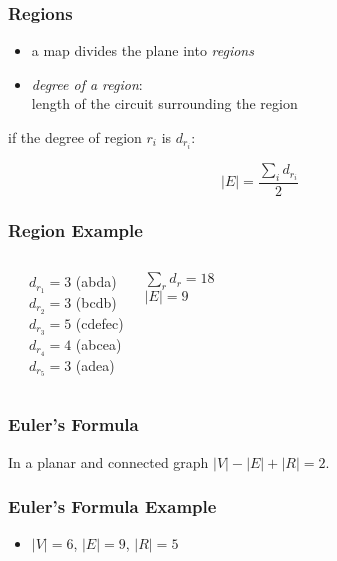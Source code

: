 \documentclass[dvipsnames]{beamer}
\begin{document}
\begin{frame}
  \frametitle{Regions}

  \begin{itemize}
    \item a map divides the plane into \emph{regions}
    \item \emph{degree of a region}:\\
      length of the circuit surrounding the region
  \end{itemize}

  \pause
  \begin{theorem}
    if the degree of region $r_i$ is $d_{r_i}$:

    \[ |E| = \frac{\sum_i d_{r_i}}{2} \]
  \end{theorem}
\end{frame}

\begin{frame}
  \frametitle{Region Example}

  \begin{example}
    \begin{columns}
      \begin{center}
      \end{center}

      \pause
      $d_{r_1} = 3$ (abda)\\
      $d_{r_2} = 3$ (bcdb)\\
      $d_{r_3} = 5$ (cdefec)\\
      $d_{r_4} = 4$ (abcea)\\
      $d_{r_5} = 3$ (adea)

      \medskip
      $\sum_r d_r = 18$\\
      $|E| = 9$
    \end{columns}
  \end{example}
\end{frame}

\begin{frame}
  \frametitle{Euler's Formula}

  \begin{theorem}
    In a planar and connected graph $|V| - |E| + |R| = 2$.
  \end{theorem}
\end{frame}

\begin{frame}
  \frametitle{Euler's Formula Example}

  \begin{example}
    \begin{center}
    \end{center}

    \begin{itemize}
     \item $|V| = 6$, $|E| = 9$, $|R| = 5$
    \end{itemize}
  \end{example}
\end{frame}
\end{document}
